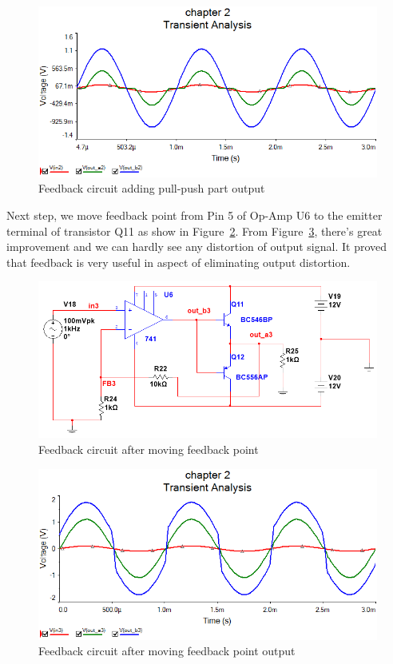 \begin{figure}[htbp]
	\centering
	\includegraphics[scale=0.7]{"../Photo/Chap2/Feedback_ini_before_data"}
	\caption{Feedback circuit adding pull-push part output}
	\label{fig:Feedback before data}
\end{figure}

Next step, we move feedback point from Pin 5 of Op-Amp U6 to the emitter terminal of transistor Q11 as show in Figure~\ref{fig:Feedback after}. From Figure~\ref{fig:Feedback after data}, there's great improvement and we can hardly see any distortion of output signal. It proved that feedback is very useful in aspect of eliminating output distortion.


\begin{figure}[htbp]
	\centering
	\includegraphics[scale=0.7]{"../Photo/Chap2/Feed_back_ini_after"}
	\caption{Feedback circuit after moving feedback point}
	\label{fig:Feedback after}
\end{figure}

\begin{figure}[htbp]
	\centering
	\includegraphics[scale=0.7]{"../Photo/Chap2/Feedback_ini_after_data"}
	\caption{Feedback circuit after moving feedback point output}
	\label{fig:Feedback after data}
\end{figure}



